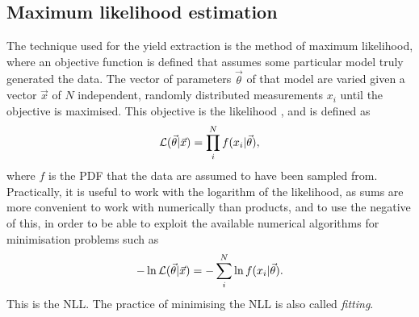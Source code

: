 \subsection{Maximum likelihood estimation}
\label{chap:prod:fitting:mle}

The technique used for the yield extraction is the method of maximum 
likelihood, where an objective function is defined that assumes some particular 
model truly generated the data.
The vector of parameters $\vec{\theta}$ of that model are varied given a vector 
$\vec{x}$ of $N$ independent, randomly distributed measurements $x_{i}$ until 
the objective is maximised.
This objective is the likelihood \likelihood, and is defined as
\begin{equation}
  \mathcal{L}(\vec{\theta}|\vec{x}) = \prod_{i}^{N} f(x_{i}|\vec{\theta}),
\end{equation}
where $f$ is the \ac{PDF} that the data are assumed to have been sampled 
from.\footnotemark
Practically, it is useful to work with the logarithm of the likelihood, as sums 
are more convenient to work with numerically than products, and to use the 
negative of this, in order to be able to exploit the available numerical 
algorithms for minimisation problems such as \minuit~\cite{James:1975dr}
\begin{equation}
  -\ln{\ensuremath{\mathcal{L}}(\vec{\theta}|\vec{x})} =
  -\sum_{i}^{N} \ln{f(x_{i}|\vec{\theta})}.
\end{equation}
This is the \acf{NLL}.
The practice of minimising the \ac{NLL} is also called \emph{fitting}.


